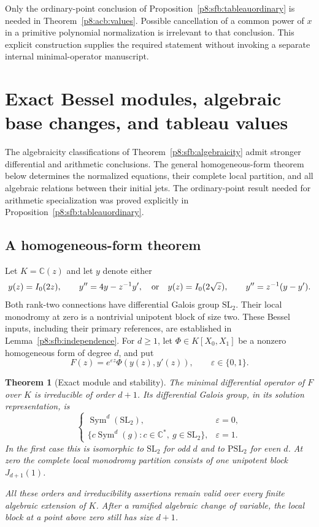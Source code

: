 \documentclass[11pt,a4paper]{article}
\newtheorem{theorem}{Theorem}[section]
\theoremstyle{definition}
\theoremstyle{remark}
\numberwithin{equation}{section}
\begin{document}
Only the ordinary-point conclusion of
Proposition~\ref{p8:sfb:tableauordinary} is needed in
Theorem~\ref{p8:acb:values}.  Possible cancellation of a common
power of $x$ in a primitive polynomial normalization is irrelevant
to that conclusion.  This explicit construction supplies the
required statement without invoking a separate internal
minimal-operator manuscript.


\clearpage

\section{Exact Bessel modules, algebraic base changes, and tableau values}
\label{p8:acb:section}

The algebraicity classifications of Theorem~\ref{p8:sfb:algebraicity}
admit stronger differential and arithmetic conclusions.  The general
homogeneous-form theorem below determines the normalized equations,
their complete local partition, and all algebraic relations between
their initial jets.  The ordinary-point result needed for arithmetic
specialization was proved explicitly in
Proposition~\ref{p8:sfb:tableauordinary}.

\subsection{A homogeneous-form theorem}

Let $K=\mathbb C(z)$ and let $y$ denote either
\[
 y(z)=I_0(2z),\qquad y''=4y-z^{-1}y',
 \quad\hbox{or}\quad
 y(z)=I_0(2\sqrt z),\qquad y''=z^{-1}(y-y').
\]
Both rank-two connections have differential Galois group $\mathrm{SL}_2$.
Their local monodromy at zero is a nontrivial unipotent block of size two.
These Bessel inputs, including their primary references, are
established in Lemma~\ref{p8:sfb:independence}.
For $d\ge1$, let $\Phi\in K[X_0,X_1]$ be a nonzero homogeneous
form of degree $d$, and put
\[
 F(z)=e^{\varepsilon z}\Phi(y(z),y'(z)),\qquad
 \varepsilon\in\{0,1\}.
\]

\begin{theorem}[Exact module and stability]\label{p8:acb:module}
The minimal differential operator of $F$ over $K$ is irreducible of
order $d+1$.  Its differential Galois group, in its solution
representation, is
\[
 \begin{cases}
 \operatorname{Sym}^{d}(\mathrm{SL}_2),&\varepsilon=0,\\
 \{c\operatorname{Sym}^{d}(g):c\in\mathbb C^*,\ g\in\mathrm{SL}_2\},
       &\varepsilon=1.
 \end{cases}
\]
In the first case this is isomorphic to $\mathrm{SL}_2$ for odd $d$
and to $\mathrm{PSL}_2$ for even $d$.
At zero the complete local monodromy partition consists of one
unipotent block $J_{d+1}(1)$.

All these orders and irreducibility assertions remain valid over
every finite algebraic extension of $K$.  After a ramified algebraic
change of variable, the local block at a point above zero still has
size $d+1$.
\end{theorem}
\end{document}
